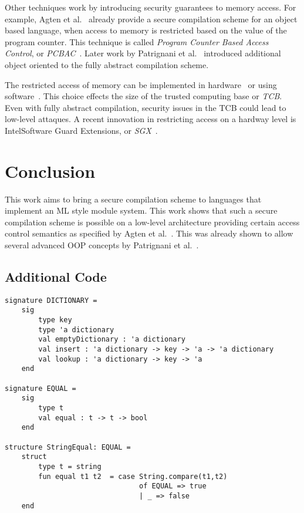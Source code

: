 \documentclass[11pt]{article}
\newcommand{\mypageref}[1]{Page~\pageref{#1}}
\newcommand{\earlier}[2]{{\protect\myref{#1}{#2}} on {\protect\mypageref{#2}}}
\begin{document}
Other techniques work by introducing security guarantees to memory access.
For example, Agten et al.~\cite{Agten:2012:SCM:2354412.2355247} already provide a secure compilation scheme for an object based language, when access to memory is restricted based on the value of the program counter. This technique is called \emph{Program Counter Based Access Control}, or \emph{PCBAC}~\cite{PCBAC}.
Later work by Patrignani et al.~\cite{Patrignani} introduced additional object oriented to the fully abstract compilation scheme.

The restricted access of memory can be implemented in hardware~\cite{Sancus,SGX} or using software~\cite{Fides,Salus}.
This choice effects the size of the trusted computing base or \emph{TCB}.
Even with fully abstract compilation, security issues in the TCB could lead to low-level attaques.
A recent innovation in restricting access on a hardway level is Intel\textregistered Software Guard Extensions, or \emph{SGX}~\cite{SGX}.

\section{Conclusion}
This work aims to bring a secure compilation scheme to languages that implement an ML style module system.
This work shows that such a secure compilation scheme is possible on a low-level architecture providing certain access control semantics as specified by Agten et al.~\cite{Agten:2012:SCM:2354412.2355247}. 
This was already shown to allow several advanced OOP concepts by Patrignani et al.~\cite{Patrignani}.

\clearpage
\begin{appendices}
\section{Additional Code}
\label{app:AdditionalCode}
\begin{lstlisting}[label={lst:AdditionalSignatures}, caption={The auxilary signatures and structures for the functor example of \earlier{lst}{lst:DictionaryFunctorExample}.}]
signature DICTIONARY =
    sig
        type key
        type 'a dictionary
        val emptyDictionary : 'a dictionary
        val insert : 'a dictionary -> key -> 'a -> 'a dictionary
        val lookup : 'a dictionary -> key -> 'a
    end

signature EQUAL =
    sig
        type t
        val equal : t -> t -> bool
    end

structure StringEqual: EQUAL = 
    struct
        type t = string
        fun equal t1 t2  = case String.compare(t1,t2)
                                of EQUAL => true
                                | _ => false
    end
\end{lstlisting}
\end{appendices}


\end{document}
